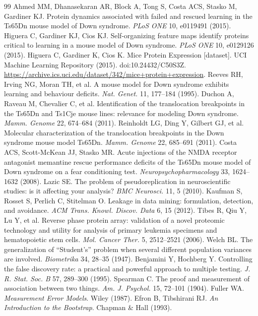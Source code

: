 \documentclass[10pt]{article}
\begin{document}
\begingroup
\small
\begin{thebibliography}{99}
\setlength{\itemsep}{0.15em}
 Ahmed MM, Dhanasekaran AR, Block A, Tong S, Costa ACS, Stasko M, Gardiner KJ.
Protein dynamics associated with failed and rescued learning in the Ts65Dn mouse model of Down
syndrome. \emph{PLoS ONE} 10, e0119491 (2015).
 Higuera C, Gardiner KJ, Cios KJ. Self-organizing feature maps identify
proteins critical to learning in a mouse model of Down syndrome. \emph{PLoS ONE} 10, e0129126
(2015).
 Higuera C, Gardiner K, Cios K. Mice Protein Expression [dataset]. UCI Machine
Learning Repository (2015). doi:10.24432/C50S3Z. \url{https://archive.ics.uci.edu/dataset/342/mice+protein+expression}.
 Reeves RH, Irving NG, Moran TH, et al. A mouse model for Down syndrome
exhibits learning and behaviour deficits. \emph{Nat. Genet.} 11, 177--184 (1995).
 Duchon A, Raveau M, Chevalier C, et al. Identification of the translocation
breakpoints in the Ts65Dn and Ts1Cje mouse lines: relevance for modeling Down syndrome.
\emph{Mamm. Genome} 22, 674--684 (2011).
 Reinholdt LG, Ding Y, Gilbert GJ, et al. Molecular characterization of the
translocation breakpoints in the Down syndrome mouse model Ts65Dn. \emph{Mamm. Genome} 22,
685--691 (2011).
 Costa ACS, Scott-McKean JJ, Stasko MR. Acute injections of the NMDA receptor
antagonist memantine rescue performance deficits of the Ts65Dn mouse model of Down syndrome on a
fear conditioning test. \emph{Neuropsychopharmacology} 33, 1624--1632 (2008).
 Lazic SE. The problem of pseudoreplication in neuroscientific studies: is it
affecting your analysis? \emph{BMC Neurosci.} 11, 5 (2010).
 Kaufman S, Rosset S, Perlich C, Stitelman O. Leakage in data mining:
formulation, detection, and avoidance. \emph{ACM Trans. Knowl. Discov. Data} 6, 15 (2012).
 Tibes R, Qiu Y, Lu Y, et al. Reverse phase protein array: validation of a novel
proteomic technology and utility for analysis of primary leukemia specimens and hematopoietic
stem cells. \emph{Mol. Cancer Ther.} 5, 2512--2521 (2006).
 Welch BL. The generalization of ``Student's'' problem when several different
population variances are involved. \emph{Biometrika} 34, 28--35 (1947).
 Benjamini Y, Hochberg Y. Controlling the false discovery rate: a practical and
powerful approach to multiple testing. \emph{J. R. Stat. Soc. B} 57, 289--300 (1995).
 Spearman C. The proof and measurement of association between two things.
\emph{Am. J. Psychol.} 15, 72--101 (1904).
 Fuller WA. \emph{Measurement Error Models}. Wiley (1987).
 Efron B, Tibshirani RJ. \emph{An Introduction to the Bootstrap}. Chapman \&
Hall (1993).
\end{thebibliography}
\endgroup
\end{document}
